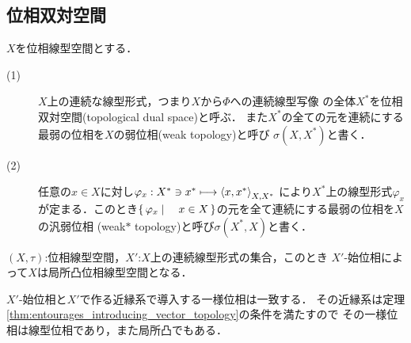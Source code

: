 \subsection{位相双対空間}
	\begin{screen}
		\begin{dfn}
			$X$を位相線型空間とする．
			\begin{description}
				\item[(1)] $X$上の連続な線型形式，つまり$X$から$\Phi$への連続線型写像
					の全体$X^*$を位相双対空間(topological dual space)と呼ぶ．
					また$X^*$の全ての元を連続にする最弱の位相を$X$の弱位相(weak topology)と呼び
					$\sigma(X,X^*)$と書く．
				
				\item[(2)] 任意の$x \in X$に対し$\varphi_x:X^* \ni x^* \longmapsto \inprod<x,x^*>_{X,X^*}$
					により$X^*$上の線型形式$\varphi_x$が定まる．このとき$\left\{\, \varphi_x \mid \quad x \in X\, \right\}$の元を全て連続にする最弱の位相を$X$の汎弱位相
					(weak$\ast$ topology)と呼び$\sigma(X^*,X)$と書く．
			\end{description}
		\end{dfn}
	\end{screen}
	
	\begin{screen}
		\begin{thm}
		\end{thm}
	\end{screen}
	
	\begin{screen}
		\begin{thm}[弱位相は局所凸線型位相]
			$(X,\tau)$:位相線型空間，$X'$:$X$上の連続線型形式の集合，このとき
			$X'$-始位相によって$X$は局所凸位相線型空間となる．
		\end{thm}
	\end{screen}
	
	\begin{sketch}
		$X'$-始位相と$X'$で作る近縁系で導入する一様位相は一致する．
		その近縁系は定理\ref{thm:entourages_introducing_vector_topology}の条件を満たすので
		その一様位相は線型位相であり，また局所凸でもある．
	\end{sketch}